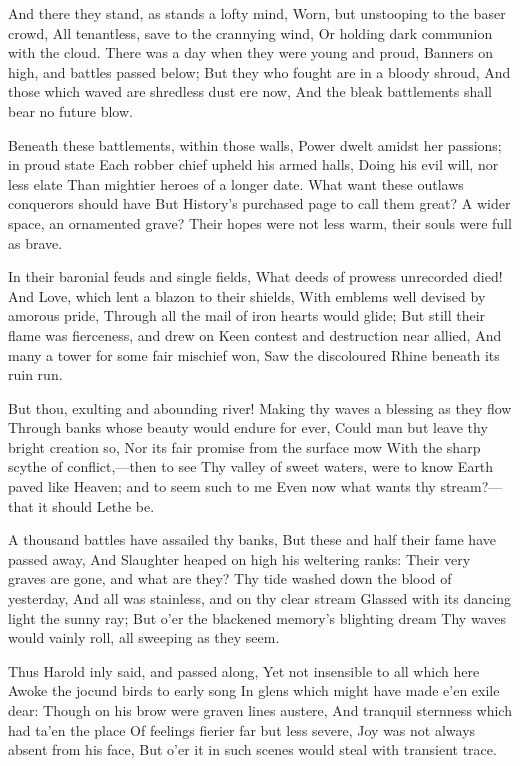 \documentclass[10pt,twocolumn]{book}
\begin{document}
   And there they stand, as stands a lofty mind,
   Worn, but unstooping to the baser crowd,
   All tenantless, save to the crannying wind,
   Or holding dark communion with the cloud.
   There was a day when they were young and proud,
   Banners on high, and battles passed below;
   But they who fought are in a bloody shroud,
   And those which waved are shredless dust ere now,
And the bleak battlements shall bear no future blow.


   Beneath these battlements, within those walls,
   Power dwelt amidst her passions; in proud state
   Each robber chief upheld his armed halls,
   Doing his evil will, nor less elate
   Than mightier heroes of a longer date.
   What want these outlaws conquerors should have
   But History's purchased page to call them great?
   A wider space, an ornamented grave?
Their hopes were not less warm, their souls were full as brave.


   In their baronial feuds and single fields,
   What deeds of prowess unrecorded died!
   And Love, which lent a blazon to their shields,
   With emblems well devised by amorous pride,
   Through all the mail of iron hearts would glide;
   But still their flame was fierceness, and drew on
   Keen contest and destruction near allied,
   And many a tower for some fair mischief won,
Saw the discoloured Rhine beneath its ruin run.


   But thou, exulting and abounding river!
   Making thy waves a blessing as they flow
   Through banks whose beauty would endure for ever,
   Could man but leave thy bright creation so,
   Nor its fair promise from the surface mow
   With the sharp scythe of conflict,---then to see
   Thy valley of sweet waters, were to know
   Earth paved like Heaven; and to seem such to me
Even now what wants thy stream?---that it should Lethe be.


   A thousand battles have assailed thy banks,
   But these and half their fame have passed away,
   And Slaughter heaped on high his weltering ranks:
   Their very graves are gone, and what are they?
   Thy tide washed down the blood of yesterday,
   And all was stainless, and on thy clear stream
   Glassed with its dancing light the sunny ray;
   But o'er the blackened memory's blighting dream
Thy waves would vainly roll, all sweeping as they seem.


   Thus Harold inly said, and passed along,
   Yet not insensible to all which here
   Awoke the jocund birds to early song
   In glens which might have made e'en exile dear:
   Though on his brow were graven lines austere,
   And tranquil sternness which had ta'en the place
   Of feelings fierier far but less severe,
   Joy was not always absent from his face,
But o'er it in such scenes would steal with transient trace.
\end{document}

